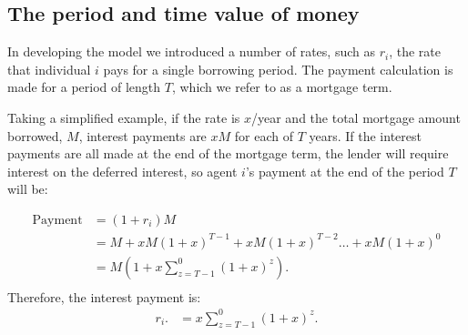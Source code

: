 

\subsection{The period and time value of money}
In developing the model we introduced a number of rates, such as $r_i$, the rate that individual $i$ pays for a single borrowing period. The payment calculation is made for a period of length $T$, which we refer to as a mortgage term.

Taking a simplified example, if the rate is $x$/year  and  the total mortgage amount borrowed, $M$, interest payments are $xM$  for each of $T$ years. 
If the interest payments are all made at the end of the mortgage term, the lender will require interest on the deferred interest, so agent $i$'s payment at the end of the period $T$ will be:

\begin{align*}
\text{Payment} &= (1+r_i)M                                 \\ 
    &= M + xM(1+x)^{T-1}+ xM(1+x)^{T-2}\dots + xM(1+x)^{0} \\
    &= M\left(1+ x\sum_{z=T-1}^0(1+x)^{z}\right).          \\ 
\end{align*}
Therefore, the interest payment is:
\begin{align*}
r_i.   &=x\sum_{z=T-1}^0(1+x)^{z}.
\end{align*}

